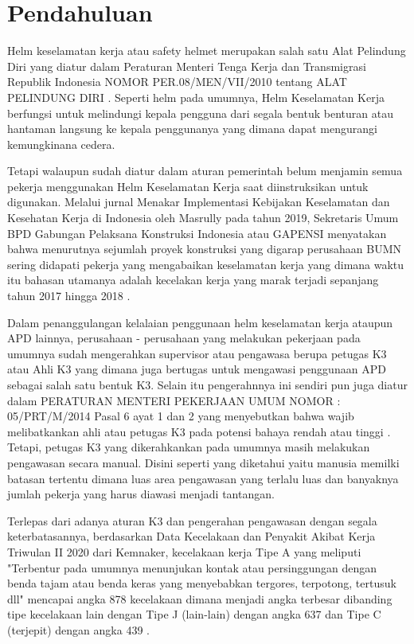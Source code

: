 \section{Pendahuluan}
\label{sec:pendahuluan}


Helm keselamatan kerja atau safety helmet merupakan salah satu Alat Pelindung Diri yang diatur dalam 
Peraturan Menteri Tenga Kerja dan Transmigrasi Republik Indonesia NOMOR PER.08/MEN/VII/2010 tentang ALAT PELINDUNG DIRI \cite{suratkementriantenagakerja}. Seperti helm pada umumnya, Helm Keselamatan Kerja berfungsi untuk melindungi kepala pengguna dari segala bentuk benturan atau hantaman langsung ke kepala penggunanya yang dimana dapat mengurangi kemungkinana cedera.

Tetapi walaupun sudah diatur dalam aturan pemerintah belum menjamin semua pekerja menggunakan Helm Keselamatan Kerja saat diinstruksikan untuk digunakan. Melalui jurnal Menakar Implementasi Kebijakan Keselamatan dan Kesehatan Kerja di Indonesia oleh Masrully pada tahun 2019, Sekretaris Umum BPD Gabungan Pelaksana Konstruksi Indonesia atau GAPENSI menyatakan bahwa menurutnya sejumlah proyek konstruksi yang digarap perusahaan BUMN sering didapati pekerja yang mengabaikan keselamatan kerja yang dimana waktu itu bahasan utamanya adalah kecelakan kerja yang marak terjadi sepanjang tahun 2017 hingga 2018 \cite{masrully2019menakar}.

Dalam penanggulangan kelalaian penggunaan helm keselamatan kerja ataupun APD lainnya, perusahaan - perusahaan yang melakukan pekerjaan pada umumnya sudah mengerahkan supervisor atau pengawasa berupa petugas K3 atau Ahli K3 yang dimana juga bertugas untuk mengawasi penggunaan APD sebagai salah satu bentuk K3. Selain itu pengerahnnya  ini sendiri pun juga diatur dalam PERATURAN MENTERI PEKERJAAN UMUM NOMOR : 05/PRT/M/2014 Pasal 6 ayat 1 dan 2  yang menyebutkan bahwa wajib melibatkankan ahli atau petugas K3 pada potensi bahaya rendah atau tinggi \cite{kementrianpekerjaanumum}. Tetapi, petugas K3 yang dikerahkankan pada umumnya masih melakukan pengawasan secara manual. Disini seperti yang diketahui yaitu manusia memilki batasan tertentu dimana luas area pengawasan yang terlalu luas dan banyaknya jumlah pekerja yang harus diawasi menjadi tantangan.

Terlepas dari adanya aturan K3 dan pengerahan pengawasan dengan segala keterbatasannya, berdasarkan Data Kecelakaan dan Penyakit Akibat Kerja Triwulan II 2020 dari Kemnaker, kecelakaan kerja Tipe A yang meliputi "Terbentur pada umumnya menunjukan kontak atau persinggungan dengan benda tajam atau benda keras yang menyebabkan tergores, terpotong, tertusuk dll" mencapai angka 878 kecelakaan dimana menjadi angka terbesar dibanding tipe kecelakaan lain dengan Tipe J (lain-lain) dengan angka 637 dan Tipe C (terjepit) dengan angka 439 \cite{satudata_kecelakaan_kerja}.

